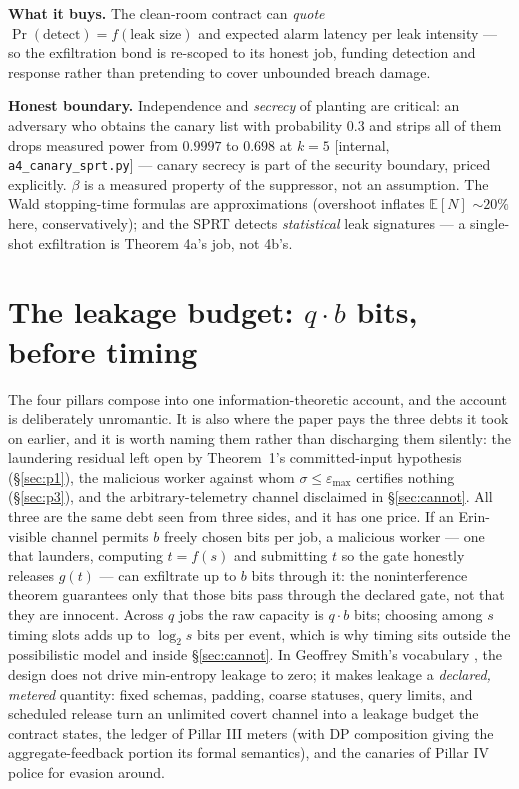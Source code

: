 \documentclass[11pt,a4paper]{article}
\begin{document}
\textbf{What it buys.} The clean-room contract can \emph{quote} $\Pr(\text{detect})=f(\text{leak size})$ and expected alarm
latency per leak intensity --- so the exfiltration bond is re-scoped to its honest job, funding detection and response rather than
pretending to cover unbounded breach damage.

\begin{boundary}
\textbf{Honest boundary.} Independence and \emph{secrecy} of planting are critical: an adversary who obtains the canary list
with probability $0.3$ and strips all of them drops measured power from $0.9997$ to $0.698$ at $k{=}5$ [internal,
\texttt{a4\_canary\_sprt.py}] --- canary secrecy is part of the security boundary, priced explicitly. $\beta$ is a measured
property of the suppressor, not an assumption. The Wald stopping-time formulas are approximations (overshoot inflates
$\mathbb{E}[N]$ ${\sim}20\%$ here, conservatively); and the SPRT detects \emph{statistical} leak signatures --- a single-shot
exfiltration is Theorem 4a's job, not 4b's.
\end{boundary}

\section{The leakage budget: $q\cdot b$ bits, before timing}\label{sec:budget}

The four pillars compose into one information-theoretic account, and the account is deliberately unromantic. It is also where the
paper pays the three debts it took on earlier, and it is worth naming them rather than discharging them silently: the laundering
residual left open by Theorem~1's committed-input hypothesis (\S\ref{sec:p1}), the malicious worker against whom
$\sigma\le\varepsilon_{\max}$ certifies nothing (\S\ref{sec:p3}), and the arbitrary-telemetry channel disclaimed in
\S\ref{sec:cannot}. All three are the same debt seen from three sides, and it has one price. If an Erin-visible
channel permits $b$ freely chosen bits per job, a malicious worker --- one that launders, computing $t=f(s)$ and submitting $t$ so
the gate honestly releases $g(t)$ --- can exfiltrate up to $b$ bits through it: the
noninterference theorem guarantees only that those bits pass through the declared gate, not that they are innocent. Across $q$
jobs the raw capacity is $q\cdot b$ bits; choosing among $s$ timing slots adds up to $\log_2 s$ bits per event, which is why
timing sits outside the possibilistic model and inside \S\ref{sec:cannot}. In Geoffrey Smith's vocabulary \cite{smith-qif}, the
design does not drive min-entropy leakage to zero; it makes leakage a \emph{declared, metered} quantity: fixed schemas, padding,
coarse statuses, query limits, and scheduled release turn an unlimited covert channel into a leakage budget the contract states,
the ledger of Pillar III meters (with DP composition giving the aggregate-feedback portion its formal semantics), and the canaries
of Pillar IV police for evasion around.
\end{document}
